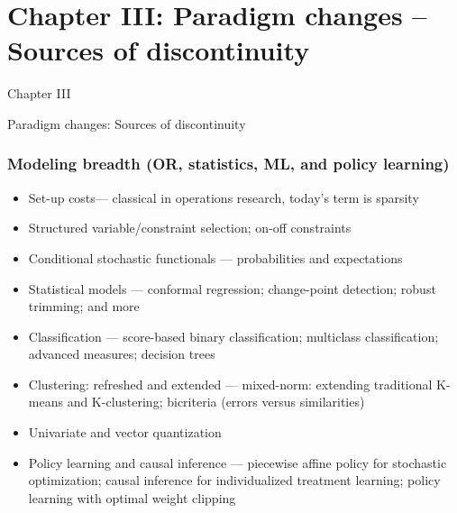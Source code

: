 \documentclass[aspectratio=169,xcolor=dvipsnames]{beamer}
\begin{document}
\section{Chapter III: Paradigm changes -- Sources of discontinuity}

\begin{frame}[plain]
  \hypertarget{chapter-paradigm}{}
  \centering
  \vfill
  {Chapter III\par}
  \vspace{0.34cm}
  {\mdseries\large
    Paradigm changes: Sources of discontinuity\par}
  \vfill
\end{frame}

\begin{frame}
  \frametitle{Modeling breadth
    {\normalsize\mdseries (OR, statistics, ML, and policy learning)}}

  \small
  \setlength{\parskip}{0pt}
  \begin{itemize}
    \setlength{\itemsep}{0.13cm}
    \item {\color{MediumBlue}Set-up costs}--- classical in operations research,
      today's term is sparsity
    \item {\color{MediumBlue}Structured variable/constraint selection};
      on-off constraints
    \item {\color{MediumBlue}Conditional stochastic functionals} ---
      probabilities and expectations
    \item {\color{MediumBlue}Statistical models} --- conformal regression;
      change-point detection; robust trimming; and more
    \item {\color{MediumBlue}Classification} --- score-based binary
      classification; multiclass classification; advanced measures;
      decision trees
    \item {\color{MediumBlue}Clustering: refreshed and extended} ---
      mixed-norm: extending traditional K-means and K-clustering;
      bicriteria (errors versus similarities)
    \item {\color{MediumBlue}Univariate and vector quantization}
    \item {\color{MediumBlue}Policy learning and causal inference} ---
      piecewise affine policy for stochastic optimization; causal inference
      for individualized treatment learning; policy learning with optimal
      weight clipping
  \end{itemize}
\end{frame}
\end{document}

